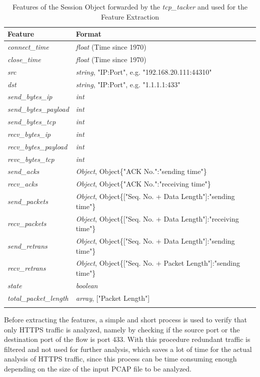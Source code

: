 \begin{center}
\begin{longtable}{ |l|l| }
\hline
Feature & Format \\
\hline
\textit{connect\_time} & \textit{float} (Time since 1970) \\
\hline
\textit{close\_time} & \textit{float} (Time since 1970) \\
\hline
\textit{src} & \textit{string}, "IP:Port", e.g. "192.168.20.111:44310" \\
\hline
\textit{dst} & \textit{string}, "IP:Port", e.g. "1.1.1.1:433" \\
\hline
\textit{send\_bytes\_ip} & \textit{int} \\
\hline
\textit{send\_bytes\_payload} & \textit{int}  \\
\hline
\textit{send\_bytes\_tcp} & \textit{int} \\
\hline
\textit{recv\_bytes\_ip} & \textit{int} \\
\hline
\textit{recv\_bytes\_payload} & \textit{int} \\
\hline
\textit{revc\_bytes\_tcp} & \textit{int} \\
\hline
\textit{send\_acks} & \textit{Object}, Object\{"ACK No.":"sending time"\} \\
\hline
\textit{recv\_acks} & \textit{Object}, Object\{"ACK No.":"receiving time"\} \\
\hline
\textit{send\_packets} & \textit{Object}, Object\{["Seq. No. + Data Length"]:"sending time"\} \\
\hline
\textit{recv\_packets} & \textit{Object}, Object\{["Seq. No. + Data Length"]:"receiving time"\} \\
\hline
\textit{send\_retrans} & \textit{Object}, Object\{["Seq. No. + Data Length"]:"sending time"\} \\
\hline
\textit{recv\_retrans} & \textit{Object}, Object\{["Seq. No. + Packet Length"]:"sending time"\} \\
\hline
\textit{state} & \textit{boolean} \\
\hline
\textit{total\_packet\_length} & \textit{array}, ["Packet Length"] \\
\hline
\caption{Features of the Session Object forwarded by the \textit{tcp\_tacker} and used for the Feature Extraction}
\label{tab:session}
\end{longtable}
\end{center}

Before extracting the features, a simple and short process is used to verify that only HTTPS traffic is analyzed, namely by checking if the source port or the destination port of the flow is port 433. With this procedure redundant traffic is filtered and not used for further analysis, which saves a lot of time for the actual analysis of HTTPS traffic, since this process can be time consuming enough depending on the size of the input PCAP file to be analyzed.


